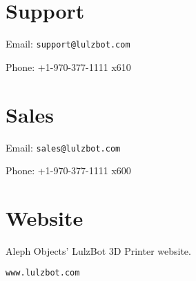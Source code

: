%
%
%
%
%

\section{Support}
\setlength{\parindent}{0pt}
Email: \texttt{support@lulzbot.com}

Phone: +1-970-377-1111 x610

\section{Sales}

Email: \texttt{sales@lulzbot.com}

Phone: +1-970-377-1111 x600

\section{Website}

Aleph Objects' LulzBot 3D Printer website.

\texttt{www.lulzbot.com}

